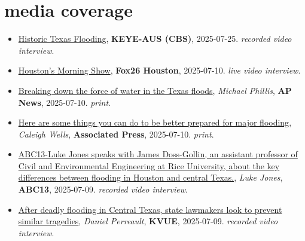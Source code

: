\documentclass[10pt,oneside]{article}
\begin{document}
\section{media coverage}

\mbox{}\vspace{-\dimexpr\baselineskip\relax}

\begin{itemize}[label={}]
  
    \item \href{https://mms.tveyes.com/Transcript.asp?StationID=2370&DateTime=7%2F25%2F2025+6%3A31%3A37+PM&LineNumber=&MediaStationID=2370&playclip=True&RefPage=&pbc=WatchlistTerm%3A1599598}{Historic Texas Flooding}, \textbf{KEYE-AUS (CBS)}, 2025-07-25.
    \textsl{recorded video interview}.
        
    \item \href{https://mms.tveyes.com/Transcript.asp?StationID=979&DateTime=7%2F10%2F2025+8%3A31%3A51+AM&LineNumber=&MediaStationID=979&playclip=True&RefPage=&pbc=WatchlistTerm%3A1599598}{Houston's Morning Show}, \textbf{Fox26 Houston}, 2025-07-10.
    \textsl{live video interview}.
        
    \item \href{https://apnews.com/article/flash-floods-texas-hill-country-hydrology-51901309407b21b65cbbc6c04206f627}{Breaking down the force of water in the Texas floods}, \textit{Michael Phillis}, \textbf{AP News}, 2025-07-10.
    \textsl{print}.
        
    \item \href{https://apnews.com/article/flood-hurricane-emergency-disaster-prepare-abb8f9cc9ab16c89a3937638739c6663}{Here are some things you can do to be better prepared for major flooding}, \textit{Caleigh Wells}, \textbf{Associated Press}, 2025-07-10.
    \textsl{print}.
        
    \item \href{https://www.facebook.com/watch/?v=1931096184096338}{ABC13-Luke Jones speaks with James Doss-Gollin, an assistant professor of Civil and Environmental Engineering at Rice University, about the key differences between flooding in Houston and central Texas.}, \textit{Luke Jones}, \textbf{ABC13}, 2025-07-09.
    \textsl{recorded video interview}.
        
    \item \href{https://www.kvue.com/article/news/politics/special-session/central-texas-flooding-special-session/269-2e5a87d4-ec92-4fb8-b850-748de1a6cbbe}{After deadly flooding in Central Texas, state lawmakers look to prevent similar tragedies}, \textit{Daniel Perreault}, \textbf{KVUE}, 2025-07-09.
    \textsl{recorded video interview}.
        

\end{itemize}
\end{document}
